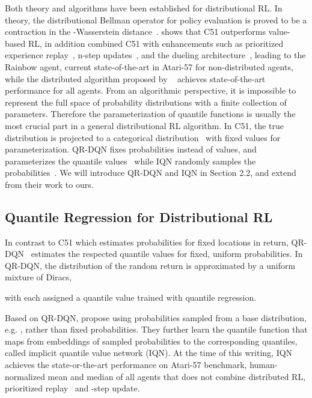 \documentclass{article}
\begin{document}
Both theory and algorithms have been established for distributional RL. In theory, the distributional Bellman operator for policy evaluation is proved to be a contraction in the -Wasserstein distance~\citep{bellemare2017distributional}. \cite{bellemare2017distributional} shows that C51 outperforms value-based RL, in addition \cite{hessel2018rainbow} combined C51 with enhancements such as prioritized experience replay~\citep{schaul2016prioritized}, n-step updates~\citep{sutton1988learning}, and the dueling architecture~\citep{wang2016dueling}, leading to the Rainbow agent, current state-of-the-art in Atari-57 for non-distributed agents, while the distributed algorithm proposed by ~\cite{kapturowski2018recurrent} achieves state-of-the-art performance for all agents.
From an algorithmic perspective, it is impossible to represent the full space of probability distributions with a finite collection of parameters. Therefore the parameterization of quantile functions is usually the most crucial part in a general distributional RL algorithm.
In C51, the true distribution is projected to a categorical distribution~\citep{bellemare2017distributional} with fixed values for parameterization. QR-DQN fixes probabilities instead of values, and parameterizes the quantile values~\citep{dabney2018implicit} while IQN randomly samples the probabilities~\citep{dabney2018implicit}. We will introduce QR-DQN and IQN in Section 2.2, and extend from their work to ours.






\subsection{Quantile Regression for Distributional RL}




In contrast to C51 which estimates probabilities for  fixed locations in return, QR-DQN~\citep{dabney2018distributional} estimates the respected quantile values for  fixed, uniform probabilities. In QR-DQN, the distribution of the random return is approximated by a uniform mixture of  Diracs,

with each  assigned a quantile value trained with quantile regression.

Based on QR-DQN, \cite{dabney2018implicit} propose using probabilities sampled from a base distribution, e.g. , rather than fixed probabilities. They further learn the quantile function that maps from embeddings of sampled probabilities to the corresponding quantiles, called implicit quantile value network (IQN). 
At the time of this writing, IQN achieves the state-or-the-art performance on Atari-57 benchmark, human-normalized mean and median of all agents that does not combine distributed RL, prioritized replay~\citep{schaul2016prioritized} and -step update.
\end{document}
